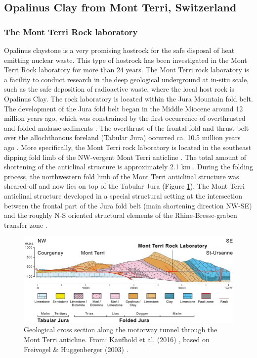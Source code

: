 \subsection{Opalinus Clay from Mont Terri, Switzerland}
\label{subsec:clay}

\subsubsection{The Mont Terri Rock laboratory}\label{sec:mont_terri}

Opalinus claystone is a very promising hostrock for the safe disposal of heat emitting nuclear waste. This type of hostrock has been investigated in the Mont Terri Rock laboratory for more than 24 years. The Mont Terri rock laboratory is a facility to conduct research in the deep geological underground at in-situ scale, such as the safe deposition of radioactive waste, where the local host rock is Opalinus Clay. The rock laboratory is located within the Jura Mountain fold belt. The development of the Jura fold belt began in the Middle Miocene around 12 million years ago, which was constrained by the first occurrence of overthrusted and folded molasse sediments \cite{bolliger1993}. The overthrust of the frontal fold and thrust belt over the allochthonous foreland (Tabular Jura) occurred ca. 10.5 million years ago \cite{becker2000}. More specifically, the Mont Terri rock laboratory is located in the southeast dipping fold limb of the NW-vergent Mont Terri anticline \cite{nussbaum2011}. The total amount of shortening of the anticlinal structure is approximately 2.1 km \cite{freivogel2003}. During the folding process, the northwestern fold limb of the Mont Terri anticlinal structure was sheared-off and now lies on top of the Tabular Jura (Figure \ref{fig:bgr_mt_sideview}). The Mont Terri anticlinal structure developed in a special structural setting at the intersection between the frontal part of the Jura fold belt (main shortening direction NW-SE) and the roughly N-S oriented structural elements of the Rhine-Bresse-graben transfer zone \cite{nussbaum2011}.

\begin{figure}[!ht]
\centering
\includegraphics[width=1\textwidth]{./figures/bgr_mont_terri_side_view.png}
\caption{Geological cross section along the motorway tunnel through the Mont Terri anticline. From: Kaufhold et al. (2016) \cite{kaufhold2016}, based on Freivogel \& Huggenberger (2003) \cite{freivogel2003}.}
\label{fig:bgr_mt_sideview}
\end{figure}

